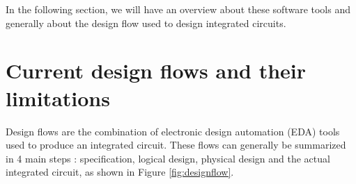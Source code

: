 In the following section, we will have an overview about these software tools and generally about the design flow used to design integrated circuits.

%
%
%

\section{Current design flows and their limitations}
\label{sec:currentflows}

Design flows are the combination of electronic design automation (EDA) tools used to produce an integrated circuit. These flows can generally be summarized in 4 main steps \cite{coursefred}: specification, logical design, physical design and the actual integrated circuit, as shown in Figure \ref{fig:designflow}.


